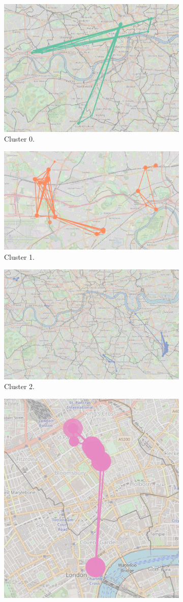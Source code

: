 \documentclass{article}
\theoremstyle{definition}
\theoremstyle{remark}
\begin{document}
\begin{figure}[!h]

\centering
\begin{subfigure}{0.6\textheight}
\centering
\includegraphics[width=0.4\linewidth]{figures/weekday_locals_c0.png}
\caption{Cluster 0.}
\label{fig:weekday_locals_c0}
\end{subfigure}
\begin{subfigure}{0.6\textheight}
\centering
\includegraphics[width=0.4\linewidth]{figures/weekday_locals_c1.png}
\caption{Cluster 1.}
\label{fig:weekday_locals_c1}
\end{subfigure}
\begin{subfigure}{0.6\textheight}
\centering
\includegraphics[width=0.4\linewidth]{figures/weekday_locals_c2.png}
\caption{Cluster 2.}
\label{fig:weekday_locals_c2}
\end{subfigure}
\begin{subfigure}{0.6\textheight}
\centering
\includegraphics[width=0.4\linewidth]{figures/weekday_locals_c3.png}

\end{subfigure}
\end{figure}
\end{document}
